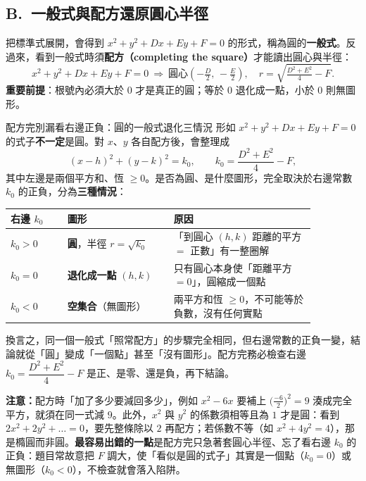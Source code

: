 \documentclass[11pt]{article}
\begin{document}
\subsection*{\sffamily B.\ 一般式與配方還原圓心半徑}

把標準式展開，會得到 $x^2+y^2+Dx+Ey+F=0$ 的形式，稱為圓的\textbf{一般式}。反過來，看到一般式時須\textbf{配方（completing the square）}才能讀出圓心與半徑：
$$x^2+y^2+Dx+Ey+F=0\ \Longrightarrow\ \text{圓心}\left(-\tfrac D2,\,-\tfrac E2\right),\quad r=\sqrt{\tfrac{D^2+E^2}{4}-F}.$$
\textbf{重要前提}：根號內必須大於 $0$ 才是真正的圓；等於 $0$ 退化成一點，小於 $0$ 則無圖形。

\begin{補充框}{配方完別漏看右邊正負：圓的一般式退化三情況}
形如 $x^2+y^2+Dx+Ey+F=0$ 的式子\textbf{不一定}是圓。對 $x$、$y$ 各自配方後，會整理成
$$(x-h)^2+(y-k)^2=k_0,\qquad k_0=\frac{D^2+E^2}{4}-F,$$
其中左邊是兩個平方和、恆 $\ge0$。是否為圓、是什麼圖形，完全取決於右邊常數 $k_0$ 的正負，分為\textbf{三種情況}：
\begin{center}
\renewcommand{\arraystretch}{1.4}
\begin{tabular}{p{0.16\linewidth} p{0.30\linewidth} p{0.40\linewidth}}
\hline
\textbf{右邊 $k_0$} & \textbf{圖形} & \textbf{原因} \\
\hline
$k_0>0$ & \textbf{圓}，半徑 $r=\sqrt{k_0}$ & 「到圓心 $(h,k)$ 距離的平方 $=$ 正數」有一整圈解 \\
$k_0=0$ & \textbf{退化成一點} $(h,k)$ & 只有圓心本身使「距離平方 $=0$」，圓縮成一個點 \\
$k_0<0$ & \textbf{空集合}（無圖形） & 兩平方和恆 $\ge0$，不可能等於負數，沒有任何實點 \\
\hline
\end{tabular}
\end{center}
換言之，同一個一般式「照常配方」的步驟完全相同，但右邊常數的正負一變，結論就從「圓」變成「一個點」甚至「沒有圖形」。配方完務必檢查右邊 $k_0=\dfrac{D^2+E^2}{4}-F$ 是正、是零、還是負，再下結論。
\end{補充框}


\textbf{注意：}配方時「加了多少要減回多少」，例如 $x^2-6x$ 要補上 $\big(\tfrac{-6}{2}\big)^2=9$ 湊成完全平方，就須在同一式減 $9$。此外，$x^2$ 與 $y^2$ 的係數須相等且為 $1$ 才是圓：看到 $2x^2+2y^2+\dots=0$，要先整條除以 $2$ 再配方；若係數不等（如 $x^2+4y^2=4$），那是橢圓而非圓。\textbf{最容易出錯的一點}是配方完只急著套圓心半徑、忘了看右邊 $k_0$ 的正負：題目常故意把 $F$ 調大，使「看似是圓的式子」其實是一個點（$k_0=0$）或無圖形（$k_0<0$），不檢查就會落入陷阱。
\end{document}
